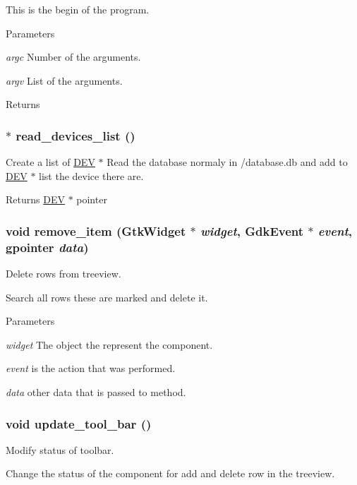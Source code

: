 This is the begin of the program. 
\begin{DoxyParams}{Parameters}
\item[{\em argc}]Number of the arguments. \item[{\em argv}]List of the arguments. \end{DoxyParams}
\begin{DoxyReturn}{Returns}

\end{DoxyReturn}
\hypertarget{usb-gui_8c_ad3b58eac54be6a412e7d9ec99857d313}{
\subsubsection[{read\_\-devices\_\-list}]{ $\ast$ read\_\-devices\_\-list ()}}
\label{usb-gui_8c_ad3b58eac54be6a412e7d9ec99857d313}


Create a list of \hyperlink{structDEV}{DEV} $\ast$ Read the database normaly in /database.db and add to \hyperlink{structDEV}{DEV} $\ast$ list the device there are. 

\begin{DoxyReturn}{Returns}
\hyperlink{structDEV}{DEV} $\ast$ pointer 
\end{DoxyReturn}
\hypertarget{usb-gui_8c_adebdd69140dd995853b3d4a40de3c058}{
\subsubsection[{remove\_\-item}]{\setlength{\rightskip}{0pt plus 5cm}void remove\_\-item (GtkWidget $\ast$ {\em widget}, \/  GdkEvent $\ast$ {\em event}, \/  gpointer {\em data})}}
\label{usb-gui_8c_adebdd69140dd995853b3d4a40de3c058}


Delete rows from treeview. 

Search all rows these are marked and delete it. 
\begin{DoxyParams}{Parameters}
\item[{\em widget}]The object the represent the component. \item[{\em event}]is the action that was performed. \item[{\em data}]other data that is passed to method. \end{DoxyParams}
\hypertarget{usb-gui_8c_a3893dfbb92994b551fb34e396c26f5d1}{
\subsubsection[{update\_\-tool\_\-bar}]{\setlength{\rightskip}{0pt plus 5cm}void update\_\-tool\_\-bar ()}}
\label{usb-gui_8c_a3893dfbb92994b551fb34e396c26f5d1}


Modify status of toolbar. 

Change the status of the component for add and delete row in the treeview. 